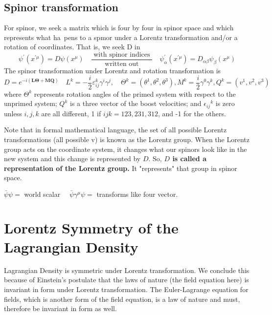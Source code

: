 \subsection{Spinor transformation}
For spinor, we seek a matrix which is four by four in spinor space and which represents what ha~pens to a spmor under a Lorentz transformation and/or a rotation of coordinates. That is, we seek D in
\begin{equation}
\psi^{\prime}\left(x^{\prime \mu}\right)=D \psi\left(x^{\mu}\right) \quad \frac{\text { with spinor indices }}{\text { written out }} \quad \psi_{\alpha}^{\prime}\left(x^{\prime \mu}\right)=D_{\alpha \beta} \psi_{\beta}\left(x^{\mu}\right)
\end{equation}
The spinor transformation under Lorentz and rotation transformation is
\begin{equation}
D=e^{-i(\mathbf{L} \mathbf{\Theta}+\mathbf{M} \mathbf{Q})} \quad L^{k}=-\frac{i}{2} \varepsilon_{i j}^{k} \gamma^{i} \gamma^{j}, \quad \Theta^{k}=\left(\theta^{1}, \theta^{2}, \theta^{3}\right), M^{k}=\frac{i}{2} \gamma^{0} \gamma^{k}, Q^{k}=\left(v^{1}, v^{2}, v^{3}\right)
\end{equation}
where $\Theta^{k}$ represents rotation angles of the primed system with respect to the unprimed system; $Q^k$ is a three vector of the boost velocities; and $\epsilon_{ij}{}^{k}$ is zero unless $i,j,k$ are all different, 1 if $ijk=123,231,312$, and -1 for the others.

Note that in formal mathematical language, the set of all possible Lorentz transformations (all possible v) is known as the Lorentz group. When the Lorentz group acts on the coordinate system, it changes what our spinors look like in the new system and this change is represented by $D$. So, \textbf{$D$ is called a representation of the Lorentz group.} It "represents" that group in spinor space.
\begin{qt}
    $\bar{\psi} \psi=$ world scalar $\quad \bar{\psi} \gamma^{\mu} \psi=$ transforms like four vector.
\end{qt}
\section{Lorentz Symmetry of the Lagrangian Density}
Lagrangian Density is symmetric under Lorentz transformation. We conclude this because of Einstein's postulate that the laws of nature (the field equation here) is invariant in form under Lorentz transformation. The Euler-Lagrange equation for fields, which is another form of the field equation, is a law of nature and must, therefore be invariant in form as well.

